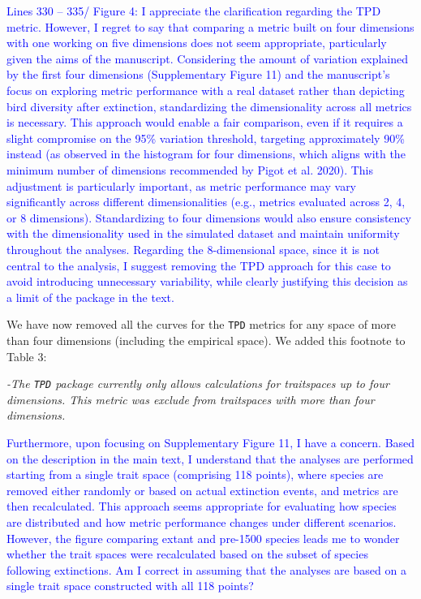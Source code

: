\documentclass[
]{article}
\begin{document}
\textcolor{blue}{Lines 330 – 335/ Figure 4: I appreciate the clarification regarding the TPD metric.
However, I regret to say that comparing a metric built on four dimensions with one working on five dimensions does not seem appropriate, particularly given the aims of the manuscript.
Considering the amount of variation explained by the first four dimensions (Supplementary Figure 11) and the manuscript's focus on exploring metric performance with a real dataset rather than depicting bird diversity after extinction, standardizing the dimensionality across all metrics is necessary.
This approach would enable a fair comparison, even if it requires a slight compromise on the 95\% variation threshold, targeting approximately 90\% instead (as observed in the histogram for four dimensions, which aligns with the minimum number of dimensions recommended by Pigot et al. 2020).
This adjustment is particularly important, as metric performance may vary significantly across different dimensionalities (e.g., metrics evaluated across 2, 4, or 8 dimensions).
Standardizing to four dimensions would also ensure consistency with the dimensionality used in the simulated dataset and maintain uniformity throughout the analyses.
Regarding the 8-dimensional space, since it is not central to the analysis, I suggest removing the TPD approach for this case to avoid introducing unnecessary variability, while clearly justifying this decision as a limit of the package in the text.}


We have now removed all the curves for the \texttt{TPD} metrics for any space of more than four dimensions (including the empirical space).
We added this footnote to Table 3:

\textit{-The \texttt{TPD} package currently only allows calculations for traitspaces up to four dimensions. This metric was exclude from traitspaces with more than four dimensions.}

\textcolor{blue}{Furthermore, upon focusing on Supplementary Figure 11, I have a concern.
Based on the description in the main text, I understand that the analyses are performed starting from a single trait space (comprising 118 points), where species are removed either randomly or based on actual extinction events, and metrics are then recalculated.
This approach seems appropriate for evaluating how species are distributed and how metric performance changes under different scenarios.
However, the figure comparing extant and pre-1500 species leads me to wonder whether the trait spaces were recalculated based on the subset of species following extinctions.
Am I correct in assuming that the analyses are based on a single trait space constructed with all 118 points?}
\end{document}
